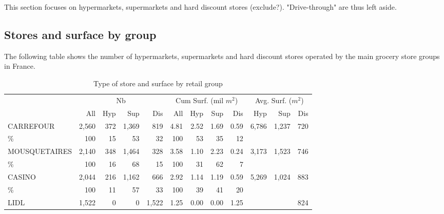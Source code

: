 \documentclass[11pt]{article}
\begin{document}
This section focuses on hypermarkets, supermarkets and hard discount stores (exclude?). "Drive-through" are thus left aside.

\subsection{Stores and surface by group}

The following table shows the number of hypermarkets, supermarkets and hard discount stores operated by the main grocery store groups in France.

\begin{table}[H]
\caption{Type of store and surface by retail group}
\footnotesize
\setlength{\tabcolsep}{2pt}

\begin{tabular}{l|rrrr|rrrr|rrr}
\toprule
\toprule
{}             & \multicolumn{4}{c|}{Nb} &   \multicolumn{4}{c|}{Cum Surf. (mil $m^2$)}   &   \multicolumn{3}{c}{Avg. Surf. ($m^2$)}\\
{}             &        All &  Hyp       &        Sup &       Dis  &      All   & Hyp        &        Sup &        Dis &      Hyp   &       Sup  &    Dis \\
\midrule
CARREFOUR      &      2,560 &        372 &      1,369 &        819 &       4.81 &       2.52 &       1.69 &       0.59 &      6,786 &      1,237 &        720 \\
\%             &        100 &         15 &         53 &         32 &        100 &         53 &         35 &         12 &            &            &            \\
MOUSQUETAIRES  &      2,140 &        348 &      1,464 &        328 &       3.58 &       1.10 &       2.23 &       0.24 &      3,173 &      1,523 &        746 \\
\%             &        100 &         16 &         68 &         15 &        100 &         31 &         62 &          7 &            &            &            \\
CASINO         &      2,044 &        216 &      1,162 &        666 &       2.92 &       1.14 &       1.19 &       0.59 &      5,269 &      1,024 &        883 \\
\%             &        100 &         11 &         57 &         33 &        100 &         39 &         41 &         20 &            &            &            \\
LIDL           &      1,522 &          0 &          0 &      1,522 &       1.25 &       0.00 &       0.00 &       1.25 &            &            &        824 \\

\end{tabular}
\end{table}
\end{document}
